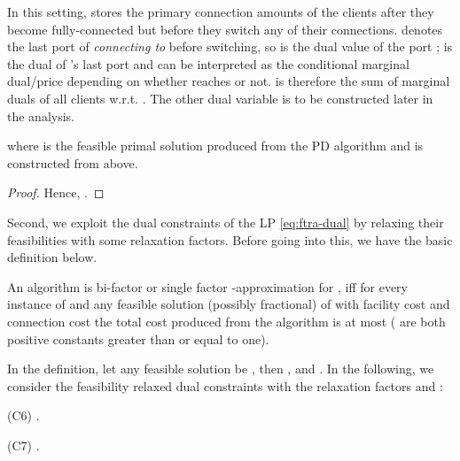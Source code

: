 \documentclass[10pt]{llncs}
\begin{document}
In this setting, \textcolor{black}{} stores
the primary connection amounts of the clients after they become fully-connected
but before they switch any of their connections. 
 denotes the last port of  \textit{connecting to }
before switching, so  is the dual value of the
port ;  is the dual of 's last port
and  can be interpreted as the conditional marginal dual/price
depending on whether  reaches  or not. 
 is therefore the sum of marginal duals of all clients w.r.t.
. The other dual variable  is to be constructed
later in the analysis.
\begin{lemma}

where  is the feasible
primal solution produced from the PD algorithm and 
is constructed from above. \label{lem: pdb}\end{lemma}
\begin{proof}
{\small 

}{\small \par}

Hence, .
\end{proof}
Second, we exploit the dual constraints of the LP \eqref{eq:ftra-dual}
by relaxing their feasibilities with some relaxation factors. Before
going into this, we have the basic definition below.
\begin{definition}
An algorithm is bi-factor  or single
factor -approximation for ,
iff for every instance  of  and any feasible
solution  (possibly fractional) of  with facility
cost  and connection cost  the total cost produced
from the algorithm is at most  (
are both positive constants greater than or equal to one).
\end{definition}
In the definition, let any feasible solution be ,
then , 
and .
In the following, we consider the feasibility relaxed dual constraints
with the relaxation factors  and :

\medskip{}


(C6) .

(C7) .

\medskip{}
\end{document}
